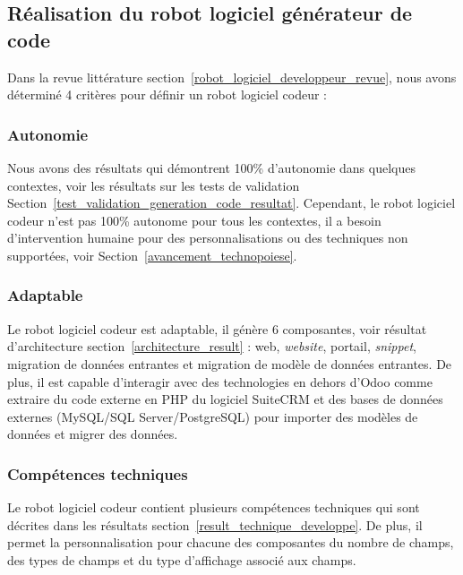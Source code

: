 
\subsection{Réalisation du robot logiciel générateur de code}
Dans la revue littérature section~\ref{robot_logiciel_developpeur_revue}, nous avons déterminé 4 critères pour définir un robot logiciel codeur :

\subsubsection{Autonomie}
Nous avons des résultats qui démontrent 100\% d'autonomie dans quelques contextes, voir les résultats sur les tests de validation Section~\ref{test_validation_generation_code_resultat}. Cependant, le robot logiciel codeur n'est pas 100\% autonome pour tous les contextes, il a besoin d'intervention humaine pour des personnalisations ou des techniques non supportées, voir Section~\ref{avancement_technopoiese}.


\subsubsection{Adaptable}
Le robot logiciel codeur est adaptable, il génère 6 composantes, voir résultat d'architecture section~\ref{architecture_result} : web, \textit{website}, portail, \textit{snippet}, migration de données entrantes et migration de modèle de données entrantes. De plus, il est capable d'interagir avec des technologies en dehors d'Odoo comme extraire du code externe en PHP du logiciel SuiteCRM et des bases de données externes (MySQL/SQL Server/PostgreSQL) pour importer des modèles de données et migrer des données.


\subsubsection{Compétences techniques}
Le robot logiciel codeur contient plusieurs compétences techniques qui sont décrites dans les résultats section~\ref{result_technique_developpe}. De plus, il permet la personnalisation pour chacune des composantes du nombre de champs, des types de champs et du type d'affichage associé aux champs.

